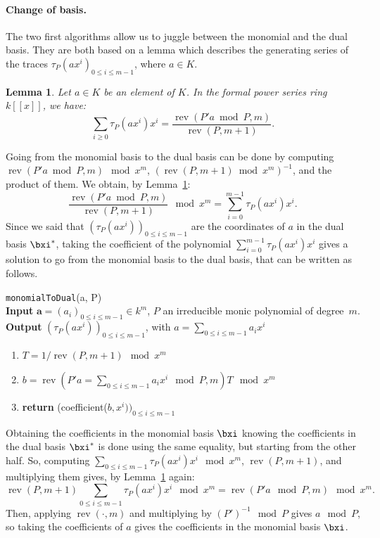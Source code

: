 \documentclass[a4paper,11pt]{article}
\theoremstyle{break}
\newtheorem{lm}[thm]{Lemma}
\theoremstyle{definition}
\theoremstyle{remark}
\DeclareMathOperator{\rev}{rev}
\begin{document}
\paragraph{Change of basis.}The two
first algorithms allow us to juggle between the monomial and the dual basis. They are
both based on a lemma which describes the generating series of the traces
$\tau_P(ax^i)_{0\leq i \leq m-1}$, where $a\in K$. 
\begin{lm}
  \label{lm-basis}
  Let $a\in K$ be an element of $K$. In the formal power series ring $k[[x]]$,
  we have:
  \[
    \sum_{i\geq 0}\tau_P(ax^i)x^i=\frac{\rev(P'a\bmod P,m)}{\rev(P,m+1)}.
  \]
\end{lm}
Going from the monomial basis to the dual basis can be done by computing
$\rev(P'a\bmod P,m)\mod x^m$, $(\rev(P,m+1)\bmod x^m)^{-1}$, and the product of
them. We obtain, by Lemma~\ref{lm-basis}:
\[
  \frac{\rev(P'a\bmod P,m)}{\rev(P,m+1)}\mod x^m=\sum_{i=0}^{m-1}\tau_P(ax^i)x^i.
\]
Since we said that
$(\tau_P(ax^i))_{0\leq i \leq m-1}$ are the coordinates of $a$ in the dual basis
$\bxi^*$, taking the coefficient of the polynomial
$\sum_{i=0}^{m-1}\tau_P(ax^i)x^i$ gives a solution to go from the monomial basis
to the dual basis, that can be written as follows.
\newline

\texttt{monomialToDual}(a, P)\\
\textbf{Input} $\textbf{a}=(a_i)_{0\leq i\leq m-1}\in k^m$, $P$ an irreducible
monic polynomial of degree~$m$.\\
\textbf{Output} $(\tau_P(ax^i))_{0\leq i \leq m-1}$, with $a=\sum_{0\leq i
\leq m-1}a_ix^i$
\begin{enumerate}
  \item $T=1/\rev(P,m+1) \mod x^m$
  \item $b=\rev(P'a=\sum_{0\leq i\leq m-1}a_ix^i \mod P,m)T\mod x^m$
  \item \textbf{return} (coefficient($b,x^i))_{0\leq i \leq m-1}$
\end{enumerate}

Obtaining the coefficients in the monomial basis $\bxi$
knowing the coefficients in the dual basis $\bxi^*$ is done using the same
equality, but starting from the other half. So, computing $\sum_{0\leq i \leq
m-1}\tau_P(ax^i)x^i \mod x^m$, $\rev(P,m+1)$, and multiplying them gives, by
Lemma~\ref{lm-basis} again: 
\[
\rev(P,m+1)\sum_{0\leq i \leq m-1}\tau_P(ax^i)x^i \mod x^m = \rev(P'a\mod P,m) 
\mod x^m.
\]
Then, applying $\rev(\cdot,m)$ and multiplying by $(P')^{-1}\mod P$ gives $a\mod
P$, so taking the coefficients of $a$ gives the coefficients in the monomial
basis $\bxi$.
\newline
\end{document}
